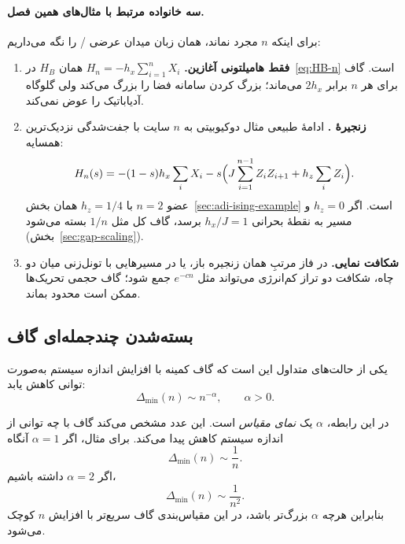 \paragraph{سه خانواده مرتبط با مثال‌های همین فصل.}
برای اینکه $n$ مجرد نماند، همان زبان میدان عرضی /  را نگه می‌داریم:
\begin{enumerate}
	\item \textbf{فقط هامیلتونی آغازین.}
	$H_n=-h_x\sum_{i=1}^{n}X_i$ همان $H_B$ در~\eqref{eq:HB-n} است.
	گاف برای هر $n$ برابر $2h_x$ می‌ماند؛ بزرگ کردن سامانه فضا را بزرگ می‌کند ولی گلوگاه آدیاباتیک را عوض نمی‌کند.
	\item \textbf{زنجیرهٔ .}
	ادامهٔ طبیعی مثال دوکیوبیتی به $n$ سایت با جفت‌شدگی نزدیک‌ترین همسایه:
	\begin{equation}
		H_n(s)
		=
		-(1-s)h_x\sum_i X_i
		-
		s\Bigl(J\sum_{i=1}^{n-1}Z_iZ_{i+1}+h_z\sum_i Z_i\Bigr).
	\end{equation}
	عضو $n=2$ با $h_z=1/4$ همان بخش~\ref{sec:adi-ising-example} است.
	اگر $h_z=0$ و مسیر به نقطهٔ بحرانی $h_x/J=1$ برسد، گاف کل مثل $1/n$ بسته می‌شود (بخش~\ref{sec:gap-scaling}).
	\item \textbf{شکافت نمایی.}
	در فاز مرتبِ همان زنجیره باز، یا در مسیرهایی با تونل‌زنی میان دو چاه، شکافت دو تراز کم‌انرژی می‌تواند مثل $e^{-cn}$ جمع شود؛ گاف حجمی تحریک‌ها ممکن است محدود بماند.
\end{enumerate}

\subsection{بسته‌شدن چندجمله‌ای گاف}

یکی از حالت‌های متداول این است که گاف کمینه با افزایش اندازه سیستم به‌صورت توانی کاهش یابد:
\begin{equation}
	\Delta_{\min}(n)
	\sim
	n^{-\alpha},
	\qquad
	\alpha>0.
	\label{eq:polynomial-gap-closing}
\end{equation}

در این رابطه، $\alpha$ یک \textit{نمای مقیاس} است. این عدد مشخص می‌کند گاف با چه توانی از اندازه سیستم کاهش پیدا می‌کند. برای مثال، اگر
$\alpha=1$
آنگاه
\begin{equation}
	\Delta_{\min}(n)\sim\frac{1}{n}.
\end{equation}
اگر
$\alpha=2 $
داشته باشیم،
\begin{equation}
	\Delta_{\min}(n)\sim\frac{1}{n^2}.
\end{equation}
بنابراین هرچه $\alpha$ بزرگ‌تر باشد، در این مقیاس‌بندی گاف سریع‌تر با افزایش $n$ کوچک می‌شود.

